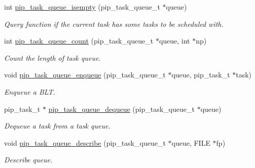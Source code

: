 \begin{DoxyCompactItemize}
\item 
int \hyperlink{group__libpip_gabf772cd5ea121458291801a26dea5c9d}{pip\-\_\-task\-\_\-queue\-\_\-isempty} (pip\-\_\-task\-\_\-queue\-\_\-t $\ast$queue)
\begin{DoxyCompactList}\small\item\em Query function if the current task has some tasks to be scheduled with. \end{DoxyCompactList}\end{DoxyCompactItemize}
\begin{DoxyCompactItemize}
\item 
int \hyperlink{group__libpip_ga5a043af776eb89933bfc0a057790cc82}{pip\-\_\-task\-\_\-queue\-\_\-count} (pip\-\_\-task\-\_\-queue\-\_\-t $\ast$queue, int $\ast$np)
\begin{DoxyCompactList}\small\item\em Count the length of task queue. \end{DoxyCompactList}\end{DoxyCompactItemize}
\begin{DoxyCompactItemize}
\item 
void \hyperlink{group__libpip_gae0f80336f51c43c3da988dd0467453cf}{pip\-\_\-task\-\_\-queue\-\_\-enqueue} (pip\-\_\-task\-\_\-queue\-\_\-t $\ast$queue, pip\-\_\-task\-\_\-t $\ast$task)
\begin{DoxyCompactList}\small\item\em Enqueue a B\-L\-T. \end{DoxyCompactList}\end{DoxyCompactItemize}
\begin{DoxyCompactItemize}
\item 
pip\-\_\-task\-\_\-t $\ast$ \hyperlink{group__libpip_ga943bace202c72533951df9fc43f62277}{pip\-\_\-task\-\_\-queue\-\_\-dequeue} (pip\-\_\-task\-\_\-queue\-\_\-t $\ast$queue)
\begin{DoxyCompactList}\small\item\em Dequeue a task from a task queue. \end{DoxyCompactList}\end{DoxyCompactItemize}
\begin{DoxyCompactItemize}
\item 
void \hyperlink{group__libpip_ga7fdea4628abd0c38779276b6cd8ebd3f}{pip\-\_\-task\-\_\-queue\-\_\-describe} (pip\-\_\-task\-\_\-queue\-\_\-t $\ast$queue, F\-I\-L\-E $\ast$fp)
\begin{DoxyCompactList}\small\item\em Describe queue. \end{DoxyCompactList}\end{DoxyCompactItemize}

